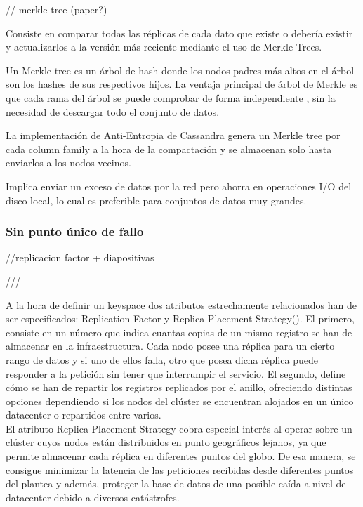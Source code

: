 // merkle tree (paper?)

Consiste en comparar todas las réplicas de cada dato que existe o debería existir y actualizarlos a la versión más reciente mediante el uso de Merkle Trees.

Un Merkle tree es un árbol de hash donde los nodos padres más altos en el árbol son los hashes de sus respectivos hijos. La ventaja principal de árbol de Merkle es que cada rama del árbol se puede comprobar de forma independiente , sin la necesidad de descargar todo el conjunto de datos.

La implementación de Anti-Entropia de Cassandra genera un Merkle tree por cada column family a la hora de la compactación y se almacenan solo hasta enviarlos a los nodos vecinos. 

Implica enviar un exceso de datos por la red pero ahorra en operaciones I/O del disco local, lo cual es preferible para conjuntos de datos muy grandes.

\subsubsection{Sin punto único de fallo}

//replicacion factor + diapositivas

///

A la hora de definir un keyspace dos atributos estrechamente relacionados han de ser especificados: Replication Factor y Replica Placement Strategy(). El primero, consiste en un número que indica cuantas copias de un mismo registro se han de almacenar en la infraestructura. Cada nodo posee una réplica para un cierto rango de datos y si uno de ellos falla, otro que posea dicha réplica puede responder a la petición sin tener que interrumpir el servicio. El segundo, define cómo se han de repartir los registros replicados por el anillo, ofreciendo distintas opciones dependiendo si los nodos del clúster se encuentran alojados en un único datacenter o repartidos entre varios.\\

El atributo Replica Placement Strategy cobra especial interés al operar sobre un clúster cuyos nodos están distribuidos en punto geográficos lejanos, ya que permite almacenar cada réplica en diferentes puntos del globo. De esa manera, se consigue minimizar la latencia de las peticiones recibidas desde diferentes puntos del plantea y además, proteger la base de datos de una posible caída a nivel de datacenter debido a diversos catástrofes.\\ 

